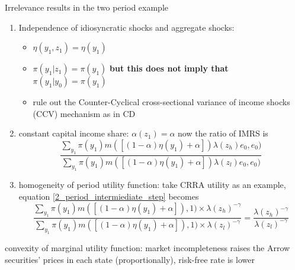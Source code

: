 \documentclass[9pt]{beamer}
\theoremstyle{mystyle}
\begin{document}
\begin{frame}{Irrelevance results in the two period example}
\begin{enumerate}
\item Independence of idiosyncratic shocks and aggregate shocks: 
\vspace{3mm}
\begin{itemize}
\item  $\eta(y_1,z_1) = \eta(y_1)$
\vspace{3mm}
\item  $\pi(y_1|z_1)=\pi(y_1)$ \textbf{but this does not imply that $\pi(y_1|y_0)=\pi(y_1)$}
\vspace{3mm}
\item rule out the Counter-Cyclical cross-sectional variance of income shocks (CCV) mechanism as in CD
\end{itemize}
\vspace{3mm}
\item constant capital income share: $\alpha(z_1) = \alpha$
now  the ratio of IMRS is 
\begin{equation}\label{2_period_intermiediate_step}
\frac{\sum_{y_1}\pi(y_1)m([(1-\alpha)\eta(y_1)+\alpha])\lambda(z_h)e_0,e_0)}{\sum_{y_1}\pi(y_1)m([(1-\alpha)\eta(y_1)+\alpha])\lambda(z_l)e_0,e_0)}
\end{equation}
\vspace{3mm}
\item homogeneity of period utility function: take CRRA utility as an example, equation \ref{2_period_intermiediate_step} becomes
\begin{equation}
\frac{\sum_{y_1}\pi(y_1)m([(1-\alpha)\eta(y_1)+\alpha]),1)\times \lambda(z_h)^{-\gamma}}{\sum_{y_1}\pi(y_1)m([(1-\alpha)\eta(y_1)+\alpha]),1)\times \lambda(z_l)^{-\gamma}} = \frac{\lambda(z_h)^{-\gamma}}{\lambda(z_l)^{-\gamma}}
\end{equation}
\end{enumerate}
convexity of marginal utility function: market incompleteness raises the Arrow securities' prices in each state (proportionally), risk-free rate is lower 
\end{frame}
\end{document}
